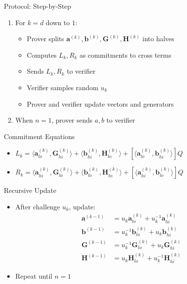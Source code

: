 \documentclass{zkdl-presentation-template}
\begin{document}
\begin{frame}{Protocol: Step-by-Step}
    \begin{enumerate}
        \item For $k = d$ down to $1$:
        \begin{itemize}
            \item Prover splits $\mathbf{a}^{(k)}, \mathbf{b}^{(k)}, \mathbf{G}^{(k)}, \mathbf{H}^{(k)}$ into halves
            \item Computes $L_k, R_k$ as commitments to cross terms
            \item Sends $L_k, R_k$ to verifier
            \item Verifier samples random $u_k$
            \item Prover and verifier update vectors and generators
        \end{itemize}
        \item When $n=1$, prover sends $a, b$ to verifier
    \end{enumerate}
\end{frame}

\begin{frame}{Commitment Equations}
    \begin{itemize}
        \item $L_k = \langle \mathbf{a}_{lo}^{(k)}, \mathbf{G}_{hi}^{(k)} \rangle + \langle \mathbf{b}_{hi}^{(k)}, \mathbf{H}_{lo}^{(k)} \rangle + [\langle \mathbf{a}_{lo}^{(k)}, \mathbf{b}_{hi}^{(k)} \rangle]Q$
        \item $R_k = \langle \mathbf{a}_{hi}^{(k)}, \mathbf{G}_{lo}^{(k)} \rangle + \langle \mathbf{b}_{lo}^{(k)}, \mathbf{H}_{hi}^{(k)} \rangle + [\langle \mathbf{a}_{hi}^{(k)}, \mathbf{b}_{lo}^{(k)} \rangle]Q$
    \end{itemize}
\end{frame}

\begin{frame}{Recursive Update}
    \begin{itemize}
        \item After challenge $u_k$, update:
        \begin{align*}
            \mathbf{a}^{(k-1)} &= u_k \mathbf{a}_{lo}^{(k)} + u_k^{-1} \mathbf{a}_{hi}^{(k)} \\
            \mathbf{b}^{(k-1)} &= u_k^{-1} \mathbf{b}_{lo}^{(k)} + u_k \mathbf{b}_{hi}^{(k)} \\
            \mathbf{G}^{(k-1)} &= u_k^{-1} \mathbf{G}_{lo}^{(k)} + u_k \mathbf{G}_{hi}^{(k)} \\
            \mathbf{H}^{(k-1)} &= u_k \mathbf{H}_{lo}^{(k)} + u_k^{-1} \mathbf{H}_{hi}^{(k)}
        \end{align*}
        \item Repeat until $n=1$
    \end{itemize}
\end{frame}
\end{document}
